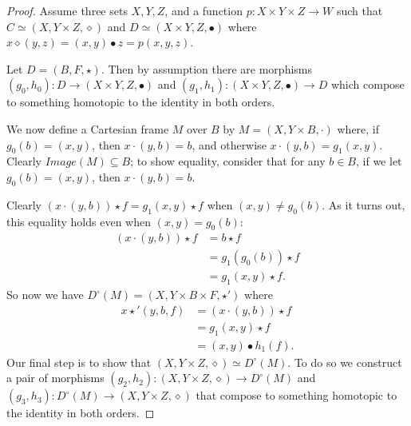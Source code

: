 \documentclass{article}
\begin{document}
\begin{proof}
Assume three sets $X, Y, Z$, and a function $p:X \times Y \times Z \to W$ such that $C \simeq (X, Y \times Z, \diamond)$ and $D \simeq (X \times Y, Z, \bullet)$ where $x \diamond (y, z) = (x, y) \bullet z = p(x, y, z)$.

Let $D = (B, F, \star)$.
Then by assumption there are morphisms $(g_0, h_0) : D \to (X \times Y, Z, \bullet)$ and $(g_1, h_1) : (X \times Y, Z, \bullet) \to D$ which compose to something homotopic to the identity in both orders.

We now define a Cartesian frame $M$ over $B$ by $M = (X, Y \times B, \cdot)$ where, if $g_0(b)=(x, y)$, then $x \cdot (y, b) = b$, and otherwise $x \cdot (y, b) = g_1(x, y)$.
Clearly $Image(M) \subseteq B$;
to show equality, consider that for any $b \in B$, if we let $g_0(b) = (x, y)$, then $x \cdot (y, b) = b$.

Clearly $(x \cdot (y, b)) \star f = g_1(x, y) \star f$ when $(x, y) \neq g_0(b)$.
As it turns out, this equality holds even when $(x, y) = g_0(b)$:
\[
\begin{split}
    (x \cdot (y, b)) \star f & = b \star f \\
                             & = g_1(g_0(b)) \star f \\
                             & = g_1(x, y) \star f.
\end{split}
\]
So now we have $D^{\circ}(M) = (X, Y \times B \times F, \star')$ where
\[
\begin{split}
    x \star' (y, b, f) & = (x \cdot (y, b)) \star f \\
                       & = g_1(x, y) \star f \\
                       & = (x, y) \bullet h_1(f).
\end{split}
\]
Our final step is to show that $(X, Y \times Z, \diamond) \simeq D^{\circ}(M)$.
To do so we construct a pair of morphisms $(g_2, h_2) : (X, Y \times Z, \diamond) \to D^{\circ}(M)$ and $(g_3, h_3) : D^{\circ}(M) \to (X, Y \times Z, \diamond)$ that compose to something homotopic to the identity in both orders.


\end{proof}
\end{document}
